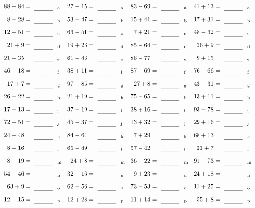 \documentclass
[
  draft    = true,
  fontsize = 11pt,
  parskip  = half-
]
{scrartcl}
\begin{document}
\clearpage
\begin{align*}
    \pline{88-84}&=\rline{a}
  & \pline{27-15}&=\rline{a}
  & \pline{83-69}&=\rline{a}
  & \pline{41+13}&=\rline{a} \\[1ex]
    \pline{8+28}&=\rline{b}
  & \pline{53-47}&=\rline{b}
  & \pline{15+41}&=\rline{b}
  & \pline{17+31}&=\rline{b} \\[1ex]
    \pline{12+51}&=\rline{c}
  & \pline{63-51}&=\rline{c}
  & \pline{7+21}&=\rline{c}
  & \pline{48-32}&=\rline{c} \\[1ex]
    \pline{21+9}&=\rline{d}
  & \pline{19+23}&=\rline{d}
  & \pline{85-64}&=\rline{d}
  & \pline{26+9}&=\rline{d} \\[1ex]
    \pline{21+35}&=\rline{e}
  & \pline{61-43}&=\rline{e}
  & \pline{86-77}&=\rline{e}
  & \pline{9+15}&=\rline{e} \\[1ex]
    \pline{46+18}&=\rline{f}
  & \pline{38+11}&=\rline{f}
  & \pline{87-69}&=\rline{f}
  & \pline{76-66}&=\rline{f} \\[1ex]
    \pline{17+7}&=\rline{g}
  & \pline{97-85}&=\rline{g}
  & \pline{27+8}&=\rline{g}
  & \pline{43-31}&=\rline{g} \\[1ex]
    \pline{26+22}&=\rline{h}
  & \pline{21+19}&=\rline{h}
  & \pline{75-65}&=\rline{h}
  & \pline{13+11}&=\rline{h} \\[1ex]
    \pline{17+13}&=\rline{i}
  & \pline{37-19}&=\rline{i}
  & \pline{38+16}&=\rline{i}
  & \pline{93-78}&=\rline{i} \\[1ex]
    \pline{72-51}&=\rline{j}
  & \pline{45-37}&=\rline{j}
  & \pline{13+32}&=\rline{j}
  & \pline{29+16}&=\rline{j} \\[1ex]
    \pline{24+48}&=\rline{k}
  & \pline{84-64}&=\rline{k}
  & \pline{7+29}&=\rline{k}
  & \pline{68+13}&=\rline{k} \\[1ex]
    \pline{8+16}&=\rline{l}
  & \pline{65-49}&=\rline{l}
  & \pline{57-42}&=\rline{l}
  & \pline{21+7}&=\rline{l} \\[1ex]
    \pline{8+19}&=\rline{m}
  & \pline{24+8}&=\rline{m}
  & \pline{36-22}&=\rline{m}
  & \pline{91-73}&=\rline{m} \\[1ex]
    \pline{54-46}&=\rline{n}
  & \pline{32-16}&=\rline{n}
  & \pline{9+23}&=\rline{n}
  & \pline{24+18}&=\rline{n} \\[1ex]
    \pline{63+9}&=\rline{o}
  & \pline{62-56}&=\rline{o}
  & \pline{73-53}&=\rline{o}
  & \pline{11+25}&=\rline{o} \\[1ex]
    \pline{12+15}&=\rline{p}
  & \pline{12+28}&=\rline{p}
  & \pline{11+14}&=\rline{p}
  & \pline{55+8}&=\rline{p}
\end{align*}
\end{document}
